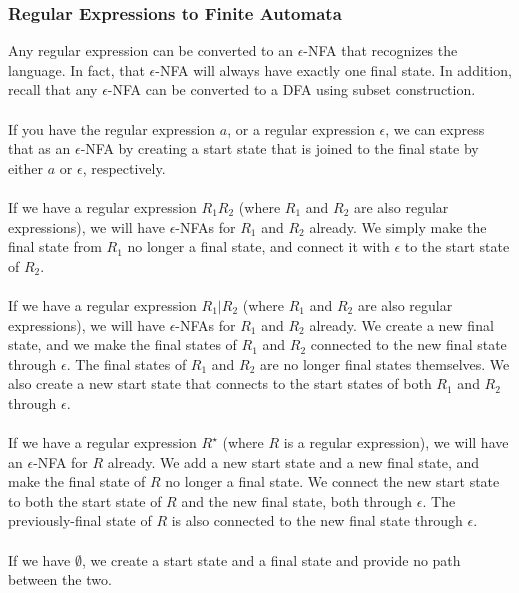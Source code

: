 \documentclass[]{article}
\theoremstyle{definition}
\begin{document}
			\subsubsection{Regular Expressions to Finite Automata}
				Any regular expression can be converted to an $\epsilon$-NFA that recognizes the language. In fact, that $\epsilon$-NFA will always have exactly one final state. In addition, recall that any $\epsilon$-NFA can be converted to a DFA using subset construction.
				\\ \\
				If you have the regular expression $a$, or a regular expression $\epsilon$, we can express that as an $\epsilon$-NFA by creating a start state that is joined to the final state by either $a$ or $\epsilon$, respectively.
				\\ \\
				If we have a regular expression $R_1 R_2$ (where $R_1$ and $R_2$ are also regular expressions), we will have $\epsilon$-NFAs for $R_1$ and $R_2$ already. We simply make the final state from $R_1$ no longer a final state, and connect it with $\epsilon$ to the start state of $R_2$.
				\\ \\
				If we have a regular expression $R_1 | R_2$ (where $R_1$ and $R_2$ are also regular expressions), we will have $\epsilon$-NFAs for $R_1$ and $R_2$ already. We create a new final state, and we make the final states of $R_1$ and $R_2$ connected to the new final state through $\epsilon$. The final states of $R_1$ and $R_2$ are no longer final states themselves. We also create a new start state that connects to the start states of both $R_1$ and $R_2$ through $\epsilon$.
				\\ \\
				If we have a regular expression $R^\star$ (where $R$ is a regular expression), we will have an $\epsilon$-NFA for $R$ already. We add a new start state and a new final state, and make the final state of $R$ no longer a final state. We connect the new start state to both the start state of $R$ and the new final state, both through $\epsilon$. The previously-final state of $R$ is also connected to the new final state through $\epsilon$.
				\\ \\
				If we have $\emptyset$, we create a start state and a final state and provide no path between the two.
\end{document}
